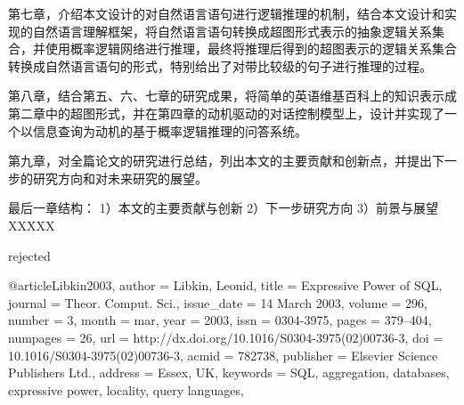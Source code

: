 第七章，介绍本文设计的对自然语言语句进行逻辑推理的机制，结合本文设计和实现的自然语言理解框架，将自然语言语句转换成超图形式表示的抽象逻辑关系集合，并使用概率逻辑网络进行推理，最终将推理后得到的超图表示的逻辑关系集合转换成自然语言语句的形式，特别给出了对带比较级的句子进行推理的过程。

第八章，结合第五、六、七章的研究成果，将简单的英语维基百科上的知识表示成第二章中的超图形式，并在第四章的动机驱动的对话控制模型上，设计并实现了一个以信息查询为动机的基于概率逻辑推理的问答系统。

第九章，对全篇论文的研究进行总结，列出本文的主要贡献和创新点，并提出下一步的研究方向和对未来研究的展望。



最后一章结构：
1）本文的主要贡献与创新
2）下一步研究方向
3）前景与展望
XXXXX


\cite{Monteleone2013} rejected

\cite{Libkin2001}

@article{Libkin2003,
 author = {Libkin, Leonid},
 title = {Expressive Power of SQL},
 journal = {Theor. Comput. Sci.},
 issue_date = {14 March 2003},
 volume = {296},
 number = {3},
 month = mar,
 year = {2003},
 issn = {0304-3975},
 pages = {379--404},
 numpages = {26},
 url = {http://dx.doi.org/10.1016/S0304-3975(02)00736-3},
 doi = {10.1016/S0304-3975(02)00736-3},
 acmid = {782738},
 publisher = {Elsevier Science Publishers Ltd.},
 address = {Essex, UK},
 keywords = {SQL, aggregation, databases, expressive power, locality, query languages},
} 


\cite{Liang2011}

\cite{Bollacker2008}
